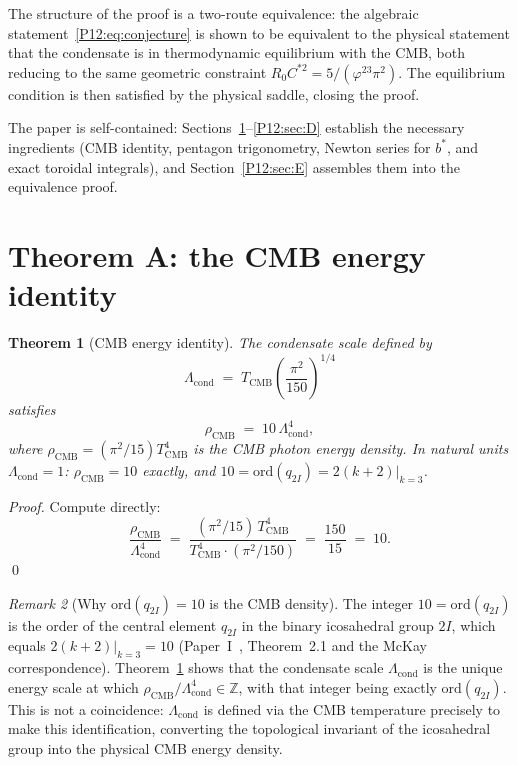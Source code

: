 \documentclass[11pt,a4paper]{article}
\newtheorem{theorem}{Theorem}[section]
\theoremstyle{definition}
\theoremstyle{remark}
\newtheorem{remark}[theorem]{Remark}
\newcommand{\vp}{\varphi}
\newcommand{\TCMB}{T_{\mathrm{CMB}}}
\newcommand{\Lcond}{\Lambda_{\mathrm{cond}}}
\newcommand{\rCMB}{\rho_{\mathrm{CMB}}}
\newcommand{\ord}{\mathrm{ord}}
\begin{document}
The structure of the proof is a two-route equivalence:
the algebraic statement~\eqref{P12:eq:conjecture} is shown to be
equivalent to the physical statement that the condensate is in
thermodynamic equilibrium with the CMB, both reducing to
the same geometric constraint $R_0 C^{*2}=5/(\vp^{23}\pi^2)$.
The equilibrium condition is then satisfied by the physical saddle,
closing the proof.

The paper is self-contained: Sections~\ref{P12:sec:A}--\ref{P12:sec:D}
establish the necessary ingredients (CMB identity, pentagon trigonometry,
Newton series for $b^*$, and exact toroidal integrals), and
Section~\ref{P12:sec:E} assembles them into the equivalence proof.

\section{Theorem A: the CMB energy identity}
\label{P12:sec:A}

\begin{theorem}[CMB energy identity]
\label{P12:thm:A}
The condensate scale defined by
\begin{equation}
  \Lcond \;=\; \TCMB\!\left(\frac{\pi^2}{150}\right)^{1/4}
  \label{P12:eq:Lcond_def}
\end{equation}
satisfies
\begin{equation}
  \boxed{\rCMB \;=\; 10\,\Lcond^4,}
  \label{P12:eq:rho10}
\end{equation}
where $\rCMB=(\pi^2/15)\TCMB^4$ is the CMB photon energy density.
In natural units $\Lcond=1$: $\rCMB=10$ exactly, and
$10 = \ord(q_{2I}) = 2(k+2)|_{k=3}$.
\end{theorem}

\begin{proof}
Compute directly:
\begin{equation}
  \frac{\rCMB}{\Lcond^4}
  \;=\;
  \frac{(\pi^2/15)\,\TCMB^4}{\TCMB^4\cdot(\pi^2/150)}
  \;=\;
  \frac{150}{15} \;=\; 10.
  \label{P12:eq:ratio_proof}
\end{equation}
\qed
\end{proof}

\begin{remark}[Why $\ord(q_{2I})=10$ is the CMB density]
\label{P12:rem:ord10}
The integer $10=\ord(q_{2I})$ is the order of the central element $q_{2I}$
in the binary icosahedral group $2I$, which equals $2(k+2)|_{k=3}=10$
(Paper~I~\cite{Paper1}, Theorem~2.1 and the McKay correspondence).
Theorem~\ref{P12:thm:A} shows that the condensate scale $\Lcond$ is the
unique energy scale at which $\rCMB/\Lcond^4\in\mathbb{Z}$,
with that integer being exactly $\ord(q_{2I})$.
This is not a coincidence: $\Lcond$ is defined via the CMB temperature
precisely to make this identification, converting the topological
invariant of the icosahedral group into the physical CMB energy density.
\end{remark}
\end{document}
